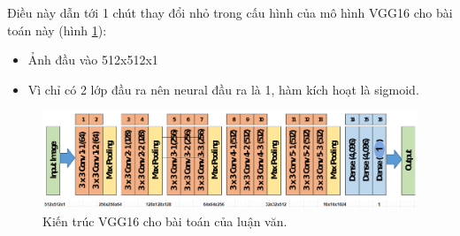 Điều này dẫn tới 1 chút thay đổi nhỏ trong cấu hình của mô hình VGG16 cho bài toán này (hình \ref{fig:vgg16_luanvan}):
\begin{itemize}
	\item Ảnh đầu vào 512x512x1
	\item Vì chỉ có 2 lớp đầu ra nên neural đầu ra là 1, hàm kích hoạt là sigmoid. 
\end{itemize}
\begin{figure}[H]
	\centering
	\includegraphics[width=1\linewidth]{images/vgg16_luanvan}
	\caption{Kiến trúc VGG16 cho bài toán của luận văn.}
	\label{fig:vgg16_luanvan}
\end{figure}

